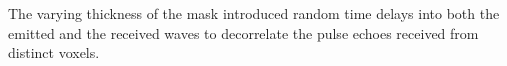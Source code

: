 The varying thickness of
the mask introduced random time delays into both
the emitted and
the received waves to decorrelate
the pulse echoes received from
distinct voxels.
